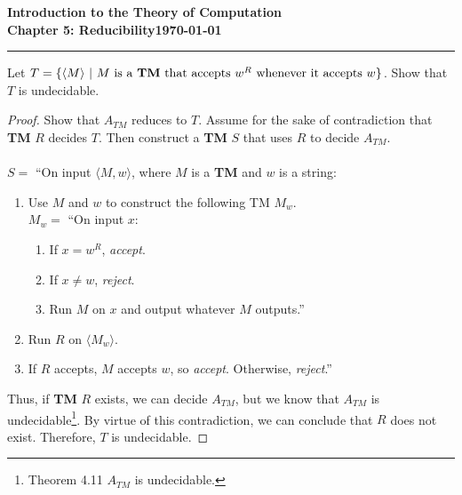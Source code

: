 \documentclass[11pt]{article}
\newcommand{\dated}{\today}
\begin{document}
\textbf{Introduction to the Theory of
Computation}\hfill\textbf{\myname}\\[0.01in]
\textbf{Chapter 5: Reducibility}\hfill\textbf{\dated}\\
\smallskip\hrule\bigskip

\begin{problem}{5.9}
Let $T = \{\langle M \rangle \ | \ M \text{ is a \textbf{TM} that accepts } w^R \text{ whenever it accepts } w\}$. Show that $T$ is undecidable.
\end{problem}

\begin{proof}
Show that $A_{TM}$ reduces to $T$. Assume for the sake of contradiction that \textbf{TM} $R$ decides $T$. Then construct a \textbf{TM} $S$ that uses $R$ to decide $A_{TM}$.  \\
\\
$S =$ \textquotedblleft On input $\langle M, w \rangle$, where $M$ is a \textbf{TM} and $w$ is a string:
\begin{enumerate}
\item Use $M$ and $w$ to construct the following TM $M_w$. \\
$M_w =$ \textquotedblleft On input $x$:
\begin{enumerate}[1.]
\item If $x = w^R$, \textit{accept}.
\item If $x \neq w$, \textit{reject}.
\item Run $M$ on $x$ and output whatever $M$ outputs.\textquotedblright
\end{enumerate}
\item Run $R$ on $\langle M_w \rangle$.
\item If $R$ accepts, $M$ accepts $w$, so \textit{accept}. Otherwise, \textit{reject}.\textquotedblright
\end{enumerate}
Thus, if \textbf{TM} $R$ exists, we can decide $A_{TM}$, but we know that $A_{TM}$ is undecidable\footnote{Theorem 4.11 $A_{TM}$ is undecidable.}. By virtue of this contradiction, we can conclude that $R$ does not exist. Therefore, $T$ is undecidable.
\end{proof}
\end{document}
